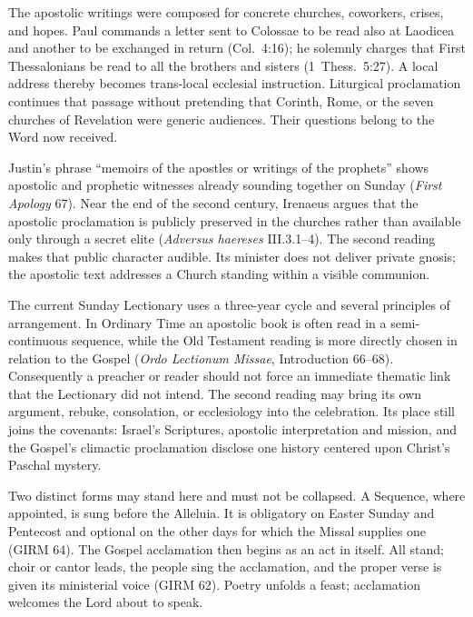 The apostolic writings were composed for concrete churches, coworkers, crises, and hopes. Paul commands a letter sent to Colossae to be read also at Laodicea and another to be exchanged in return (Col.~4:16); he solemnly charges that First Thessalonians be read to all the brothers and sisters (1~Thess.~5:27). A local address thereby becomes trans-local ecclesial instruction. Liturgical proclamation continues that passage without pretending that Corinth, Rome, or the seven churches of Revelation were generic audiences. Their questions belong to the Word now received.

Justin's phrase ``memoirs of the apostles or writings of the prophets'' shows apostolic and prophetic witnesses already sounding together on Sunday (\emph{First Apology} 67). Near the end of the second century, Irenaeus argues that the apostolic proclamation is publicly preserved in the churches rather than available only through a secret elite (\emph{Adversus haereses} III.3.1--4). The second reading makes that public character audible. Its minister does not deliver private gnosis; the apostolic text addresses a Church standing within a visible communion.

The current Sunday Lectionary uses a three-year cycle and several principles of arrangement. In Ordinary Time an apostolic book is often read in a semi-continuous sequence, while the Old Testament reading is more directly chosen in relation to the Gospel (\emph{Ordo Lectionum Missae}, Introduction 66--68). Consequently a preacher or reader should not force an immediate thematic link that the Lectionary did not intend. The second reading may bring its own argument, rebuke, consolation, or ecclesiology into the celebration. Its place still joins the covenants: Israel's Scriptures, apostolic interpretation and mission, and the Gospel's climactic proclamation disclose one history centered upon Christ's Paschal mystery.


Two distinct forms may stand here and must not be collapsed. A Sequence, where appointed, is sung before the Alleluia. It is obligatory on Easter Sunday and Pentecost and optional on the other days for which the Missal supplies one (GIRM 64). The Gospel acclamation then begins as an act in itself. All stand; choir or cantor leads, the people sing the acclamation, and the proper verse is given its ministerial voice (GIRM 62). Poetry unfolds a feast; acclamation welcomes the Lord about to speak.

